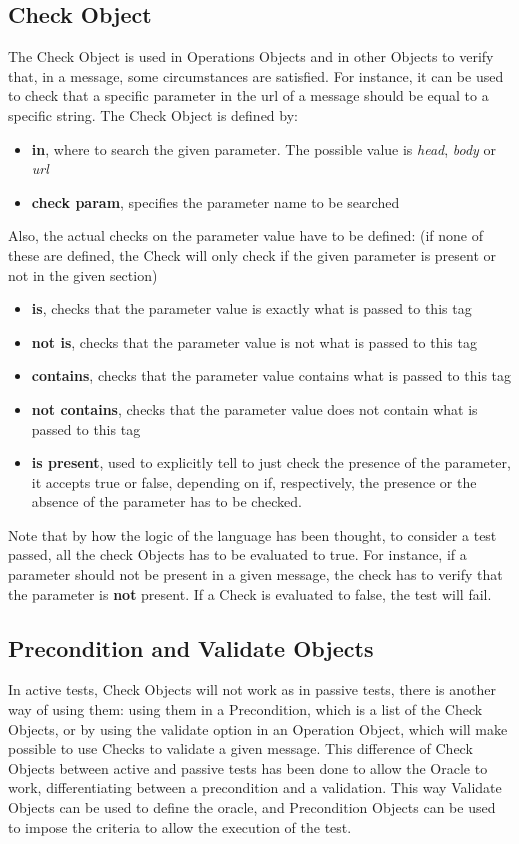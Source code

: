 \subsection{Check Object}
The Check Object is used in Operations Objects and in other Objects to verify that, in a message, some circumstances are satisfied. For instance, it can be used to check that a specific parameter in the url of a message should be equal to a specific string.
The Check Object is defined by:
\begin{itemize}
    \item \textbf{in}, where to search the given parameter. The possible value is \textit{head}, \textit{body} or \textit{url}
    \item \textbf{check param}, specifies the parameter name to be searched
\end{itemize}
Also, the actual checks on the parameter value have to be defined: (if none of these are defined, the Check will only check if the given parameter is present or not in the given section)
\begin{itemize}
    \item \textbf{is}, checks that the parameter value is exactly what is passed to this tag
    \item \textbf{not is}, checks that the parameter value is not what is passed to this tag
    \item \textbf{contains}, checks that the parameter value contains what is passed to this tag 
    \item \textbf{not contains}, checks that the parameter value does not contain what is passed to this tag 
    \item \textbf{is present}, used to explicitly tell to just check the presence of the parameter, it accepts true or false, depending on if, respectively, the presence or the absence of the parameter has to be checked.
\end{itemize}

Note that by how the logic of the language has been thought, to consider a test passed, all the check Objects has to be evaluated to true. For instance, if a parameter should not be present in a given message, the check has to verify that the parameter is \textbf{not} present. If a Check is evaluated to false, the test will fail.

\subsection{Precondition and Validate Objects}
In active tests, Check Objects will not work as in passive tests, there is another way of using them: using them in a Precondition, which is a list of the Check Objects, or by using the validate option in an Operation Object, which will make possible to use Checks to validate a given message. This difference of Check Objects between active and passive tests has been done to allow the Oracle to work, differentiating between a precondition and a validation. This way Validate Objects can be used to define the oracle, and Precondition Objects can be used to impose the criteria to allow the execution of the test.

